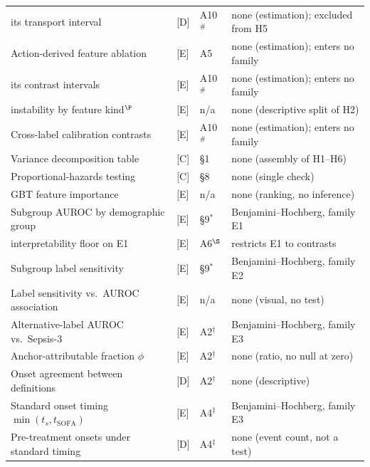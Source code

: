 {\begin{longtable}{p{5.0cm}lp{1.9cm}p{4.2cm}}
        \quad\quad its transport interval          & [D] & A10$^{\#}$ & none (estimation); excluded from H5 \\
        Action-derived feature ablation           & [E] & A5      & none (estimation); enters no family    \\
        \quad its contrast intervals               & [E] & A10$^{\#}$ & none (estimation); enters no family \\
        \quad instability by feature kind$^\P$     & [E] & n/a     & none (descriptive split of H2)         \\
        Cross-label calibration contrasts         & [E] & A10$^{\#}$ & none (estimation); enters no family \\
        Variance decomposition table              & [C] & \S1     & none (assembly of H1--H6)              \\
        Proportional-hazards testing              & [C] & \S8     & none (single check)                    \\
        GBT feature importance                    & [E] & n/a     & none (ranking, no inference)           \\
        Subgroup AUROC by demographic group       & [E] & \S9$^*$ & Benjamini--Hochberg, family E1         \\
        \quad interpretability floor on E1         & [E] & A6$^\S$ & restricts E1 to \pcNSubgroupContrasts{} contrasts \\
        Subgroup label sensitivity                & [E] & \S9$^*$ & Benjamini--Hochberg, family E2         \\
        Label sensitivity vs.\ AUROC association  & [E] & n/a     & none (visual, no test)                 \\
        Alternative-label AUROC vs.\ Sepsis-3     & [E] & A2$^\dagger$ & Benjamini--Hochberg, family E3    \\
        Anchor-attributable fraction $\phi$       & [E] & A2$^\dagger$ & none (ratio, no null at zero)     \\
        Onset agreement between definitions       & [D] & A2$^\dagger$ & none (descriptive)                \\
        Standard onset timing $\min(t_s, t_{\text{SOFA}})$ & [E] & A4$^\ddagger$ & Benjamini--Hochberg, family E3 \\
        Pre-treatment onsets under standard timing & [D] & A4$^\ddagger$ & none (event count, not a test)   \\
\end{longtable}
}
